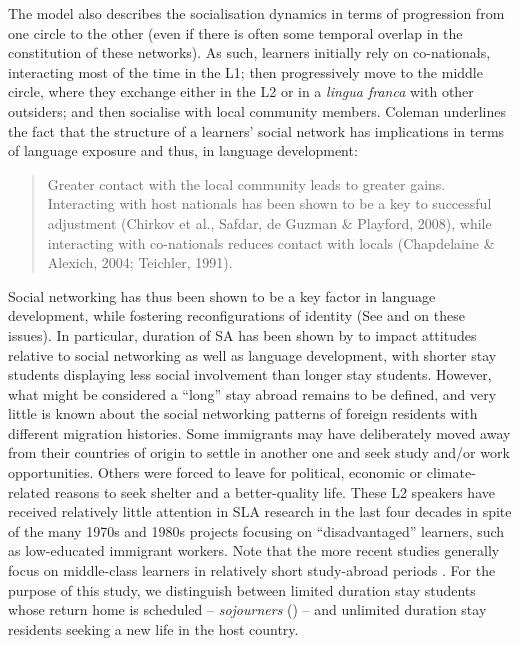 \documentclass[output=paper]{langscibook}
\begin{document}
The model also describes the socialisation dynamics in terms of progression from one circle to the other (even if there is often some temporal overlap in the constitution of these networks). As such, learners initially rely on co-nationals, interacting most of the time in the L1; then progressively move to the middle circle, where they exchange either in the L2 or in a \textit{lingua franca} with other outsiders; and then socialise with local community members. Coleman underlines the fact that the structure of a learners’ social network has implications in terms of language exposure and thus, in language development:

\begin{quote}
Greater contact with the local community leads to greater gains. Interacting with host nationals has been shown to be a key to successful adjustment (Chirkov et al., Safdar, de Guzman \& Playford, 2008), while interacting with co-nationals reduces contact with locals (Chapdelaine \& Alexich, 2004; Teichler, 1991).\hbox{}\hfill\hbox{\citep[43]{Coleman2015}}
\end{quote}

Social networking has thus been shown to be a key factor in language development, while fostering reconfigurations of identity (See \citealt{Grieve2013,Grieve2015} and \citealt{Compiegne2020} on these issues). In particular, duration of SA has been shown by \citet{Grieve2015} to impact attitudes relative to social networking as well as language development, with shorter stay students displaying less social involvement than longer stay students. However, what might be considered a “long” stay abroad remains to be defined, and very little is known about the social networking patterns of foreign residents with different migration histories. Some immigrants may have deliberately moved away from their countries of origin to settle in another one and seek study and/or work opportunities. Others were forced to leave for political, economic or climate-related reasons to seek shelter and a better-quality life. These L2 speakers have received relatively little attention in SLA research in the last four decades in spite of the many 1970s and 1980s projects focusing on “disadvantaged” learners, such as low-educated immigrant workers. Note that the more recent studies generally focus on middle-class learners in relatively short study-abroad periods \citep{Young-Scholten2013}. For the purpose of this study, we distinguish between limited duration stay students whose return home is scheduled – \textit{sojourners} (\citealt{Isabelli-GarciaIsabelli2020}) – and unlimited duration stay residents seeking a new life in the host country.
\end{document}
